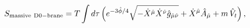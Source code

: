 \begin{equation}
\label{term1}
S_{\rm massive\  D0-brane}
=T\int d\tau\,\Big(e^{-3\hat{\phi}/4}\sqrt{-\dot{X}^{\hat{\mu}}\dot{X}^{\hat{\nu}} \hat{g}_{\hat{\mu}\hat{\nu}}}+\dot{X}^{\hat{\mu}} \hat{A}_{\hat{\mu}}+m\,\hat{V}_t\Big)\,,
\end{equation}

